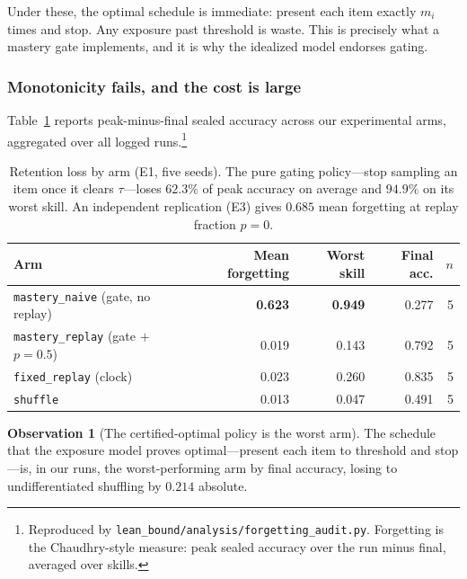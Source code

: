 \documentclass[11pt]{article}
\theoremstyle{plain}
\theoremstyle{definition}
\newtheorem{observation}{Observation}
\theoremstyle{remark}
\begin{document}
Under these, the optimal schedule is immediate: present each item exactly $m_i$
times and stop. Any exposure past threshold is waste. This is precisely what a
mastery gate implements, and it is why the idealized model endorses gating.

\subsubsection{Monotonicity fails, and the cost is large}

Table~\ref{tab:forget} reports peak-minus-final sealed accuracy across our
experimental arms, aggregated over all logged runs.\footnote{Reproduced by
\texttt{lean\_bound/analysis/forgetting\_audit.py}. Forgetting is the
Chaudhry-style measure: peak sealed accuracy over the run minus final, averaged
over skills.}

\begin{table}[ht]
\centering
\small
\begin{tabular}{@{}lrrrr@{}}
\toprule
Arm & Mean forgetting & Worst skill & Final acc. & $n$ \\
\midrule
\texttt{mastery\_naive} (gate, no replay) & \textbf{0.623} & \textbf{0.949} & 0.277 & 5 \\
\texttt{mastery\_replay} (gate $+$ $p{=}0.5$) & 0.019 & 0.143 & 0.792 & 5 \\
\texttt{fixed\_replay} (clock) & 0.023 & 0.260 & 0.835 & 5 \\
\texttt{shuffle} & 0.013 & 0.047 & 0.491 & 5 \\
\bottomrule
\end{tabular}
\caption{Retention loss by arm (E1, five seeds). The pure gating policy---stop
sampling an item once it clears $\tau$---loses $62.3\%$ of peak accuracy on
average and $94.9\%$ on its worst skill. An independent replication (E3) gives
$0.685$ mean forgetting at replay fraction $p=0$.}
\label{tab:forget}
\end{table}

\begin{observation}[The certified-optimal policy is the worst arm]
\label{obs:worst}
The schedule that the exposure model proves optimal---present each item to
threshold and stop---is, in our runs, the worst-performing arm by final accuracy,
losing to undifferentiated shuffling by $0.214$ absolute.
\end{observation}
\end{document}
